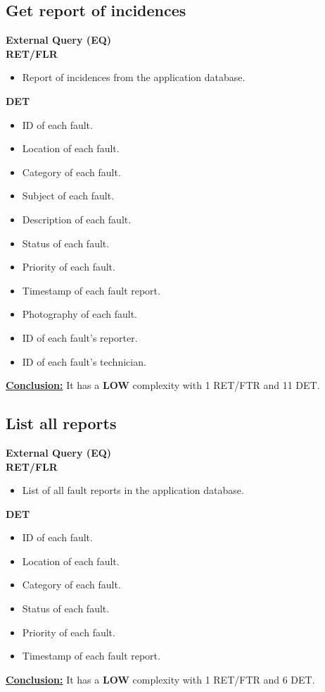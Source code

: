 \subsection{Get report of incidences}
\textbf{External Query (EQ)} \\ 
\textbf{RET/FLR}
\begin{itemize}
\item Report of incidences from the application database.
\end{itemize}
\textbf{DET}
\begin{itemize}
\item ID of each fault.
\item Location of each fault.
\item Category of each fault.
\item Subject of each fault.
\item Description of each fault.
\item Status of each fault.
\item Priority of each fault.
\item Timestamp of each fault report.
\item Photography of each fault.
\item ID of each fault's reporter.
\item ID of each fault's technician.
\end{itemize}
\textbf{\underline{Conclusion:}} It has a \textbf{LOW} complexity with 1 RET/FTR and 11 DET.

\subsection{List all reports}
\textbf{External Query (EQ)} \\ 
\textbf{RET/FLR}
\begin{itemize}
\item List of all fault reports in the application database.
\end{itemize}
\textbf{DET}
\begin{itemize}
\item ID of each fault.
\item Location of each fault.
\item Category of each fault.
\item Status of each fault.
\item Priority of each fault.
\item Timestamp of each fault report.
\end{itemize}
\textbf{\underline{Conclusion:}} It has a \textbf{LOW} complexity with 1 RET/FTR and 6 DET.



